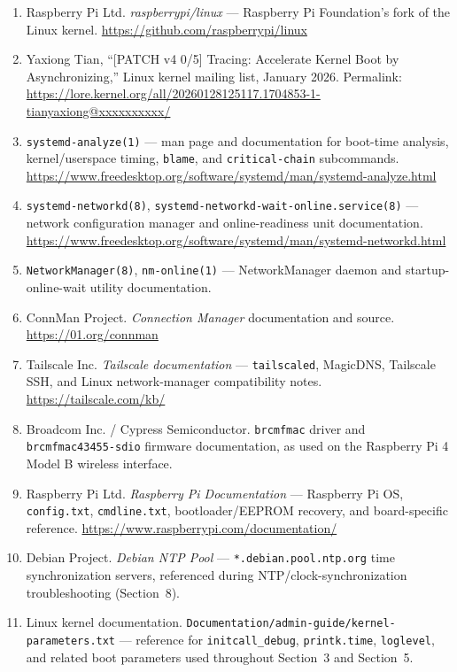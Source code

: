 \documentclass[11pt,a4paper]{article}
\begin{document}
\begin{enumerate}
    \item Raspberry Pi Ltd. \textit{raspberrypi/linux} — Raspberry Pi Foundation's fork of the Linux kernel. \url{https://github.com/raspberrypi/linux}
    \item Yaxiong Tian, ``[PATCH v4 0/5] Tracing: Accelerate Kernel Boot by Asynchronizing,'' Linux kernel mailing list, January 2026. Permalink: \url{https://lore.kernel.org/all/20260128125117.1704853-1-tianyaxiong@xxxxxxxxxx/}
    \item \texttt{systemd-analyze(1)} — man page and documentation for boot-time analysis, kernel/userspace timing, \texttt{blame}, and \texttt{critical-chain} subcommands. \url{https://www.freedesktop.org/software/systemd/man/systemd-analyze.html}
    \item \texttt{systemd-networkd(8)}, \texttt{systemd-networkd-wait-online.service(8)} — network configuration manager and online-readiness unit documentation. \url{https://www.freedesktop.org/software/systemd/man/systemd-networkd.html}
    \item \texttt{NetworkManager(8)}, \texttt{nm-online(1)} — NetworkManager daemon and startup-online-wait utility documentation.
    \item ConnMan Project. \textit{Connection Manager} documentation and source. \url{https://01.org/connman}
    \item Tailscale Inc. \textit{Tailscale documentation} — \texttt{tailscaled}, MagicDNS, Tailscale SSH, and Linux network-manager compatibility notes. \url{https://tailscale.com/kb/}
    \item Broadcom Inc. / Cypress Semiconductor. \texttt{brcmfmac} driver and \texttt{brcmfmac43455-sdio} firmware documentation, as used on the Raspberry Pi 4 Model B wireless interface.
    \item Raspberry Pi Ltd. \textit{Raspberry Pi Documentation} — Raspberry Pi OS, \texttt{config.txt}, \texttt{cmdline.txt}, bootloader/EEPROM recovery, and board-specific reference. \url{https://www.raspberrypi.com/documentation/}
    \item Debian Project. \textit{Debian NTP Pool} — \texttt{*.debian.pool.ntp.org} time synchronization servers, referenced during NTP/clock-synchronization troubleshooting (Section~8).
    \item Linux kernel documentation. \texttt{Documentation/admin-guide/kernel-parameters.txt} — reference for \texttt{initcall\_debug}, \texttt{printk.time}, \texttt{loglevel}, and related boot parameters used throughout Section~3 and Section~5.
\end{enumerate}
\end{document}
